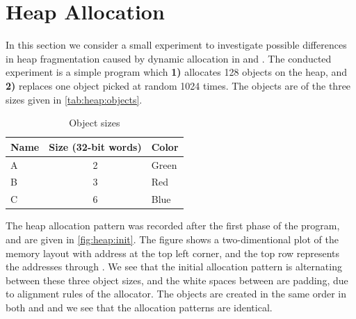 \section{Heap Allocation}
\label{sec:res:heap}
In this section we consider a small experiment to investigate possible differences in heap fragmentation caused by dynamic allocation in {\C} and {\rust}.
The conducted experiment is a simple program which \textbf{1)} allocates 128 objects on the heap, and \textbf{2)} replaces one object picked at random 1024 times.
The objects are of the three sizes given in \autoref{tab:heap:objects}.

\begin{table}[H]
  \centering
  \begin{tabular}{l|c|l}
    \textbf{Name} & \textbf{Size (32-bit words)} & \textbf{Color} \\
    \hline
    A & 2 & Green \\
    B & 3 & Red \\
    C & 6 & Blue \\
    \hline
  \end{tabular}
  \caption{Object sizes}
  \label{tab:heap:objects}
\end{table}

The heap allocation pattern was recorded after the first phase of the program, and are given in \autoref{fig:heap:init}.
The figure shows a two-dimentional plot of the memory layout with address  at the top left corner, and the top row represents the addresses  through .
We see that the initial allocation pattern is alternating between these three object sizes, and the white spaces between are padding, due to alignment rules of the allocator.
The objects are created in the same order in both {\C} and {\rust} and we see that the allocation patterns are identical.

